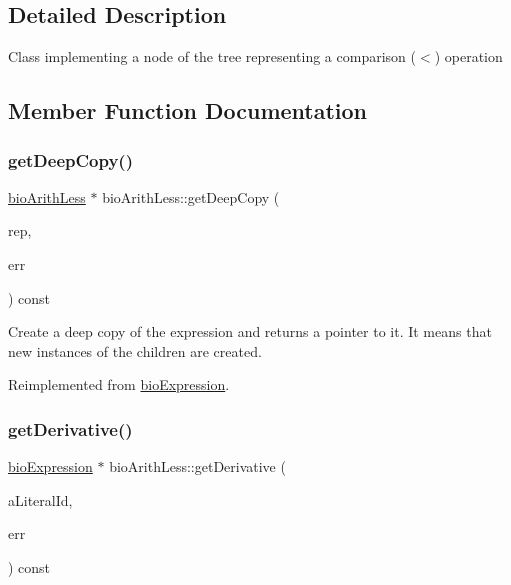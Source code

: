 \subsection{Detailed Description}
Class implementing a node of the tree representing a comparison ($<$) operation 

\subsection{Member Function Documentation}
\mbox{\label{classbio_arith_less_a44f8cd0243ba7997d9799537c099c5a8}} 
\subsubsection{\texorpdfstring{get\+Deep\+Copy()}{getDeepCopy()}}
{\footnotesize\ttfamily \hyperlink{classbio_arith_less}{bio\+Arith\+Less} $\ast$ bio\+Arith\+Less\+::get\+Deep\+Copy (\begin{DoxyParamCaption}\item[{\hyperlink{classbio_expression_repository}{bio\+Expression\+Repository} $\ast$}]{rep,  }\item[{pat\+Error $\ast$\&}]{err }\end{DoxyParamCaption}) const\hspace{0.3cm}{\ttfamily [virtual]}}

Create a deep copy of the expression and returns a pointer to it. It means that new instances of the children are created. 

Reimplemented from \hyperlink{classbio_expression_a4ee1b8add634078a02eaae26cd40dcc8}{bio\+Expression}.

\mbox{\label{classbio_arith_less_a031bd542ab09a456fcdd4f4e121d2940}} 
\subsubsection{\texorpdfstring{get\+Derivative()}{getDerivative()}}
{\footnotesize\ttfamily \hyperlink{classbio_expression}{bio\+Expression} $\ast$ bio\+Arith\+Less\+::get\+Derivative (\begin{DoxyParamCaption}\item[{pat\+U\+Long}]{a\+Literal\+Id,  }\item[{pat\+Error $\ast$\&}]{err }\end{DoxyParamCaption}) const\hspace{0.3cm}{\ttfamily [virtual]}}

